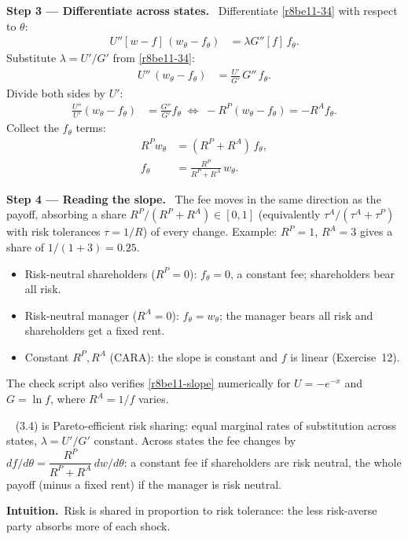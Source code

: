 \documentclass[11pt,a4paper]{article}
\newcommand{\step}[2]{\par\medskip\noindent\textbf{Step #1 --- #2.}~}
\newcommand{\intuition}{\par\medskip\noindent\textbf{Intuition.}~}
\newcommand{\answer}[1]{\par\smallskip\noindent\fbox{\textbf{Answer #1.}}~}
\begin{document}
\step{3}{Differentiate across states} Differentiate \eqref{r8be11-34} with respect to $\theta$:
\begin{align}
  U''[w-f]\,(w_\theta - f_\theta) &= \lambda G''[f]\,f_\theta. \nonumber
\end{align}
Substitute $\lambda=U'/G'$ from \eqref{r8be11-34}:
\begin{align}
  U''\,(w_\theta - f_\theta) &= \frac{U'}{G'}\,G''\,f_\theta. \nonumber
\end{align}
Divide both sides by $U'$:
\begin{align}
  \frac{U''}{U'}(w_\theta - f_\theta) &= \frac{G''}{G'}f_\theta
  \;\Longleftrightarrow\; -R^P(w_\theta-f_\theta) = -R^A f_\theta. \nonumber
\end{align}
Collect the $f_\theta$ terms:
\begin{align}
  R^P w_\theta &= (R^P+R^A)\,f_\theta, \nonumber\\
  f_\theta &= \frac{R^P}{R^P+R^A}\,w_\theta. \label{r8be11-slope}
\end{align}

\step{4}{Reading the slope} The fee moves in the same direction as the payoff, absorbing a share $R^P/(R^P+R^A)\in[0,1]$ (equivalently $\tau^A/(\tau^A+\tau^P)$ with risk tolerances $\tau=1/R$) of every change. Example: $R^P=1$, $R^A=3$ gives a share of $1/(1+3)=0.25$.
\begin{itemize}
  \item Risk-neutral shareholders ($R^P=0$): $f_\theta=0$, a constant fee; shareholders bear all risk.
  \item Risk-neutral manager ($R^A=0$): $f_\theta=w_\theta$; the manager bears all risk and shareholders get a fixed rent.
  \item Constant $R^P,R^A$ (CARA): the slope is constant and $f$ is linear (Exercise~12).
\end{itemize}
The check script also verifies \eqref{r8be11-slope} numerically for $U=-e^{-x}$ and $G=\ln f$, where $R^A=1/f$ varies.

\answer{} (3.4) is Pareto-efficient risk sharing: equal marginal rates of substitution across states, $\lambda=U'/G'$ constant. Across states the fee changes by $df/d\theta=\dfrac{R^P}{R^P+R^A}\,dw/d\theta$: a constant fee if shareholders are risk neutral, the whole payoff (minus a fixed rent) if the manager is risk neutral.

\intuition Risk is shared in proportion to risk tolerance: the less risk-averse party absorbs more of each shock.
\end{document}

